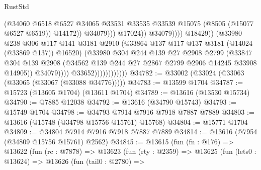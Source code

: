 \begin{lexlean}{RustStd}
\begin{coremodule}
                                                        (@34060
                                                          @6518
                                                          @6527
                                                          @34065
                                                          @33531
                                                          @33535
                                                          @33539
                                                          @15075
                                                          (@8505 (@15077 @6527 @6519))
                                                          @14172))
                                                      @34079)))
                                                @17024))
                                            @34079))))
                                    @18429))
                                (@33980
                                  @238
                                  @306
                                  @117
                                  @141
                                  @3181
                                  @2910
                                  (@33864 @137 @117 @137 @3181 (@14024 (@33869 @137)) @16520)
                                  (@33980
                                    @304
                                    @244
                                    @139
                                    @27
                                    @2908
                                    @2799
                                    (@33847
                                      @304
                                      @139
                                      @2908
                                      (@34562 @139 @244 @27 @2867 @2799 @2906 @14245 @33908 @14905))
                                    @34079))))
                            @33652))))))))))))
@34782 := @33002 (@33024 (@33063 (@33065 (@33067 (@33088 @34776)))))
@34783 := @13599 @1704
@34787 := @15723 (@13605 @1704) (@13611 @1704)
@34789 := @13616 (@13530 @15734)
@34790 := @7885 @12038
@34792 := @13616 (@34790 @15743)
@34793 := @15749 @1704
@34798 := @34793 @7914 @7916 @7918 @7887 @7889
@34803 := @13616 (@15748 (@34798 @15756 @15761) @15768)
@34804 := @15771 @1704
@34809 := @34804 @7914 @7916 @7918 @7887 @7889
@34814 := @13616 (@7954 (@34809 @15756 @15761) @2562)
@34845 := @13615
    (fun (fn : @176) =>
    @13622
      (fun (rc : @7878) =>
      @13623
        (fun (rty : @2359) =>
        @13625
          (fun (lets0 : @13624) =>
          @13626
            (fun (tail0 : @2780) =>

\end{coremodule}
\end{lexlean}
